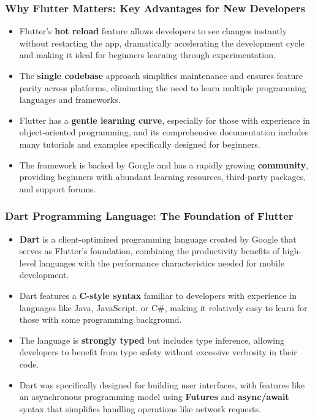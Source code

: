 \documentclass{beamer}
\begin{document}
	\begin{frame}
		\frametitle{Why Flutter Matters: Key Advantages for New Developers}
		
		\begin{itemize}
			\item Flutter's \textbf{hot reload} feature allows developers to see changes instantly without restarting the app, dramatically accelerating the development cycle and making it ideal for beginners learning through experimentation.
			\item The \textbf{single codebase} approach simplifies maintenance and ensures feature parity across platforms, eliminating the need to learn multiple programming languages and frameworks.
			\item Flutter has a \textbf{gentle learning curve}, especially for those with experience in object-oriented programming, and its comprehensive documentation includes many tutorials and examples specifically designed for beginners.
			\item The framework is backed by Google and has a rapidly growing \textbf{community}, providing beginners with abundant learning resources, third-party packages, and support forums.
		\end{itemize}
	\end{frame}
	
	\begin{frame}
		\frametitle{Dart Programming Language: The Foundation of Flutter}
		
		\begin{itemize}
			\item \textbf{Dart} is a client-optimized programming language created by Google that serves as Flutter's foundation, combining the productivity benefits of high-level languages with the performance characteristics needed for mobile development.
			\item Dart features a \textbf{C-style syntax} familiar to developers with experience in languages like Java, JavaScript, or C\#, making it relatively easy to learn for those with some programming background.
			\item The language is \textbf{strongly typed} but includes type inference, allowing developers to benefit from type safety without excessive verbosity in their code.
			\item Dart was specifically designed for building user interfaces, with features like an asynchronous programming model using \textbf{Futures} and \textbf{async/await} syntax that simplifies handling operations like network requests.
		\end{itemize}
	\end{frame}
	
\end{document}
